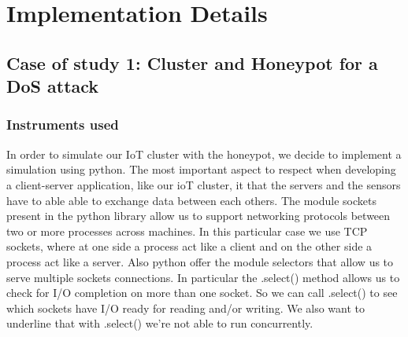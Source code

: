 \chapter{Implementation Details}

\section{Case of study 1: Cluster and Honeypot for a DoS attack}
\subsection{Instruments used}
In order to simulate our IoT cluster with the honeypot, we decide to implement a simulation using python. The most important aspect 
to respect when developing a client-server application, like our ioT cluster, it that the servers and the sensors have to able able to exchange data 
between each others. The module sockets present in  the python library allow us to support networking protocols between two or more processes across machines. In this particular case we use TCP sockets, where at one side a process act like a client and on the other side a process act like a server. Also python offer the module selectors that allow us to serve multiple sockets connections. In particular the .select() method allows us to check for I/O completion on more than one socket. So we can call .select() to see which sockets have I/O ready for reading and/or writing.  We also want to underline that with .select()  we’re not able to run concurrently. 
